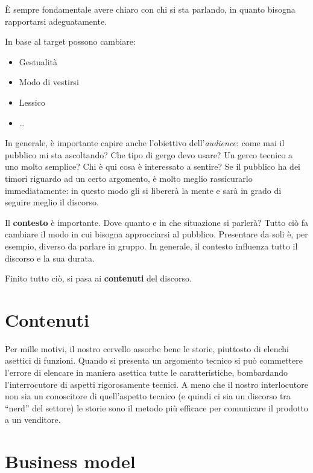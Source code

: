 È sempre fondamentale avere chiaro con chi si sta parlando, in quanto bisogna
rapportarsi adeguatamente.

In base al target possono cambiare:
\begin{itemize}
 \item Gestualità
 \item Modo di vestirsi
 \item Lessico
 \item \dots
\end{itemize}

In generale, è importante capire anche l'obiettivo dell'\textit{audience}: come
mai il pubblico mi sta ascoltando? Che tipo di gergo devo usare? Un gerco
tecnico a uno molto semplice? Chi è qui cosa è interessato a sentire? Se il
pubblico ha dei timori riguardo ad un certo argomento, è molto meglio
rassicurarlo immediatamente: in questo modo gli si libererà la mente e sarà in
grado di seguire meglio il discorso.

Il \textbf{contesto} è importante. Dove quanto e in che situazione si parlerà?
Tutto ciò fa cambiare il modo in cui bisogna approcciarsi al pubblico.
Presentare da soli è, per esempio, diverso da parlare in gruppo. In generale,
il contesto influenza tutto il discorso e la sua durata.

Finito tutto ciò, si pasa ai \textbf{contenuti} del discorso.

\section{Contenuti}


Per mille motivi, il nostro cervello assorbe bene le storie, piuttosto di
elenchi asettici di funzioni. Quando si presenta un argomento tecnico si può
commettere l'errore di elencare in maniera asettica tutte le caratteristiche,
bombardando l'interrocutore di aspetti rigorosamente tecnici. A meno che il
nostro interlocutore non sia un conoscitore di quell'aspetto tecnico (e quindi
ci sia un discorso tra ``nerd'' del settore) le storie sono il metodo più
efficace per comunicare il prodotto a un venditore.


\section{Business model}

